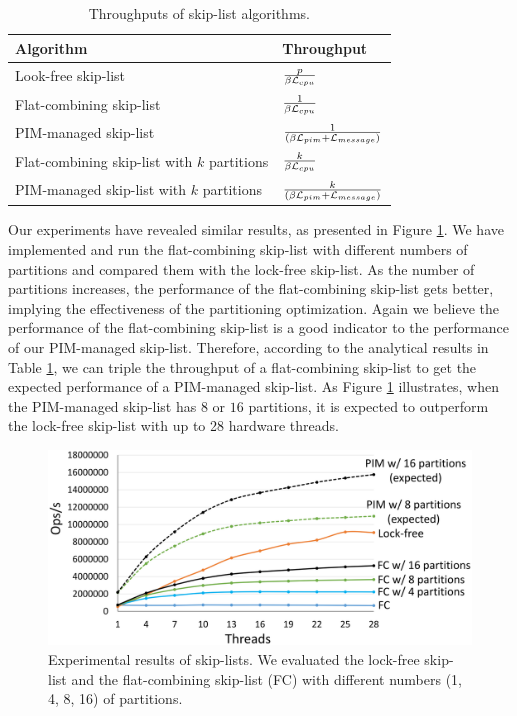 \begin{table}[ht!]
\begin{center}
	\begin{tabular}{| >{\small}l | l |}
    \hline
    Algorithm & Throughput\\ \hline
    Look-free skip-list & ${p \over \beta\mathcal{L}_{cpu}}$ \\ \hline
    Flat-combining skip-list & ${1 \over \beta\mathcal{L}_{cpu}}$ \\ \hline
    PIM-managed skip-list & ${1 \over (\beta\mathcal{L}_{pim} + \mathcal{L}_{message})}$ \\ \hline
    Flat-combining skip-list with $k$ partitions & ${k \over \beta\mathcal{L}_{cpu}}$ \\ \hline
    PIM-managed skip-list with $k$ partitions & ${k \over (\beta\mathcal{L}_{pim} + \mathcal{L}_{message})}$ \\ \hline
    \end{tabular}
\end{center}
\caption{Throughputs of skip-list algorithms.}
\label{tab:skiplist}
\end{table}

Our experiments have revealed similar results, 
as presented in Figure \ref{figure:skiplist_data}.
We have implemented and run the flat-combining skip-list with different numbers of
partitions and compared them with the lock-free skip-list.
As the number of partitions increases, the performance of the flat-combining skip-list
gets better, implying the effectiveness of the partitioning optimization.
Again we believe the performance of the flat-combining skip-list is a good indicator
to the performance of our PIM-managed skip-list.
Therefore, according to the analytical results in Table \ref{tab:skiplist}, we can triple the throughput 
of a flat-combining skip-list to get the expected performance of a PIM-managed skip-list.
As Figure \ref{figure:skiplist_data} illustrates, when the PIM-managed skip-list has $8$ or $16$ 
partitions, it is expected to outperform the lock-free skip-list with up to 28 hardware threads.

\begin{figure}[ht!]
    \centering
    \includegraphics[width=1.0\linewidth]{skiplist_data.eps} %
    \caption{Experimental results of skip-lists. We evaluated the lock-free skip-list and 
    the flat-combining skip-list (FC) with different numbers (1, 4, 8, 16) of partitions.}
    \label{figure:skiplist_data}
\end{figure}


